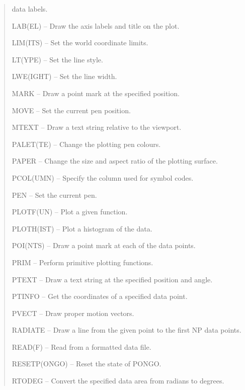 \documentclass[twoside,11pt]{article}
\newcommand{\htmlref}[2]{#1}
\renewcommand{\_}{\texttt{\symbol{95}}}
\newcommand{\iref} [1]{\htmlref{#1}{#1}}
\newcommand{\iiref}[2]{\htmlref{#1}{#2}}
\begin{document}
\begin {quote}
\begin {description}
                                          data labels.
\item [\iiref{LAB(EL)}{LABEL}] -- Draw the axis labels and title on
                                  the plot.
\item [\iiref{LIM(ITS)}{LIMITS}] -- Set the world coordinate limits.
\item [\iiref{LT(YPE)}{LTYPE}] -- Set the line style.
\item [\iiref{LWE(IGHT)}{LWEIGHT}] -- Set the line width.
\item [\iref{MARK}] -- Draw a point mark at the specified position.
\item [\iref{MOVE}] -- Set the current pen position.
\item [\iref{MTEXT}] -- Draw a text string relative to the viewport.
\item [\iiref{PALET(TE)}{PALETTE}] -- Change the plotting pen colours.
\item [\iref{PAPER}] -- Change the size and aspect ratio of the plotting
                        surface.
\item [\iiref{PCOL(UMN)}{PCOLUMN}] -- Specify the column used for symbol
                                      codes.
\item [\iref{PEN}] -- Set the current pen.
\item [\iiref{PLOTF(UN)}{PLOTFUN}] -- Plot a given function.
\item [\iiref{PLOTH(IST)}{PLOTHIST}] -- Plot a histogram of the data.
\item [\iiref{POI(NTS)}{POINTS}] -- Draw a point mark at each of the
                                    data points.
\item [\iref{PRIM}] -- Perform primitive plotting functions.
\item [\iref{PTEXT}] -- Draw a text string at the specified position and angle.
\item [\iref{PTINFO}] -- Get the coordinates of a specified data point.
\item [\iref{PVECT}] -- Draw proper motion vectors.
\item [\iref{RADIATE}] -- Draw a line from the given point to the first NP data
                          points.
\item [\iiref{READ(F)}{READF}] -- Read from a formatted data file.
\item [\iiref{RESETP(ONGO)}{RESETPONGO}] -- Reset the state of PONGO.
\item [\iref{RTODEG}] -- Convert the specified data area from radians to
                         degrees.

\end{description}
\end{quote}
\end{document}
